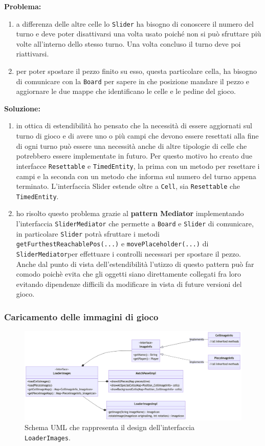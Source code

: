 \documentclass[a4paper,12pt]{report}
\begin{document}
\textbf{Problema:}
\begin{enumerate}
\item a differenza delle altre celle lo \texttt{Slider} ha bisogno di conoscere il numero del turno e deve poter disattivarsi una volta usato poiché non si può sfruttare più volte all’interno dello stesso turno. Una volta concluso il turno deve poi riattivarsi.
\item per poter spostare il pezzo finito su esso, questa particolare cella, ha bisogno di comunicare con la \texttt{Board} per sapere in che posizione mandare il pezzo e aggiornare le due mappe che identificano le celle e le pedine del gioco.
\end{enumerate}
\textbf{Soluzione:} 
\begin{enumerate}
\item in ottica di estendibilità ho pensato che la necessità di essere aggiornati sul turno di gioco e di avere uno o più campi che devono essere resettati alla fine di ogni turno può essere una necessità anche di altre tipologie di celle che potrebbero essere implementate in futuro. Per questo motivo ho creato due interfacce \texttt{Resettable} e \texttt{TimedEntity}, la prima con un metodo per resettare i campi e la seconda con un metodo che informa sul numero del turno appena terminato. L'interfaccia Slider estende oltre a \texttt{Cell}, sia \texttt{Resettable} che \texttt{TimedEntity}.
\item ho risolto questo problema grazie al  \textbf{pattern Mediator} implementando l’interfaccia \texttt{SliderMediator} che permette a \texttt{Board} e \texttt{Slider} di comunicare, in particolare \texttt{Slider} potrà sfruttare i metodi
\texttt{getFurthestReachablePos(...)} e \texttt{movePlaceholder(...)} di \texttt{SliderMediator}per effettuare i controlli necessari per spostare il pezzo. Anche dal punto di vista dell’estendibilità l’utizzo di questo pattern può far comodo poichè evita che gli oggetti siano direttamente collegati fra loro evitando dipendenze difficili da modificare in vista di future versioni del gioco.
\end{enumerate}

\subsubsection{Caricamento delle immagini di gioco}

\begin{figure}[H]
\centering
\includegraphics[width=\textwidth]{images/loader-images.png}
\caption{Schema UML che rappresenta il design dell'interfaccia \texttt{LoaderImages}.}
\label{images:loader-images}
\end{figure}
\end{document}
